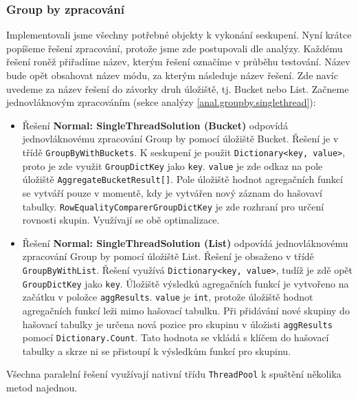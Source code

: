 \subsubsection{Group by zpracování}

Implementovali jsme všechny potřebné objekty k vykonání seskupení.
Nyní krátce popíšeme řešení zpracování, protože jsme zde postupovali dle analýzy.
Každému řešení roněž přiřadíme název, kterým řešení označíme v průběhu testování.
Název bude opět obsahovat název módu, za kterým následuje název řešení.
Zde navíc uvedeme za název řešení do závorky druh úložiště, tj. Bucket nebo List.
Začneme jednovláknovým zpracováním (sekce analýzy \ref{anal.groupby.singlethread}):
\begin{itemize}

\item Řešení \textbf{Normal: SingleThreadSolution (Bucket)} odpovídá jednovláknovému zpracování Group by pomocí úložiště Bucket.
Řešení je v třídě \texttt{GroupByWithBuckets}.
K seskupení je použit \texttt{Dictionary<key, value>}, proto je zde využit \texttt{GroupDictKey} jako \texttt{key}.
\texttt{value} je zde odkaz na pole úložiště \texttt{AggregateBucketResult[]}.
Pole úložiště hodnot agregačních funkcí se vytváří pouze v momentě, kdy je vytvářen nový záznam do hašovaví tabulky.
\texttt{RowEqualityComparerGroupDictKey} je zde rozhraní pro určení rovnosti skupin.
Využívají se obě optimalizace.

\item  Řešení \textbf{Normal: SingleThreadSolution (List)} odpovídá jednovláknovému zpracování Group by pomocí úložiště List.
Řešení je obsaženo v třídě \texttt{GroupByWithList}.
Řešení využívá \texttt{Dictionary<key, value>}, tudíž je zdě opět \texttt{GroupDictKey} jako \texttt{key}.
Úložiště výsledků agregačních funkcí je vytvořeno na začátku v položce \texttt{aggResults}.
\texttt{value} je \texttt{int}, protože úložiště hodnot agregačních funkcí leži mimo hašovací tabulku.
Při přidávání nové skupiny do hašovací tabulky je určena nová pozice pro skupinu v úložisti \texttt{aggResults} pomocí \texttt{Dictionary.Count}.
Tato hodnota se vkládá s klíčem do hašovací tabulky a skrze ni se přistoupí k výsledkům funkcí pro skupinu.
\end{itemize}
Všechna paralelní řešení využívají nativní třídu \texttt{ThreadPool} k spuštění několika metod najednou.
